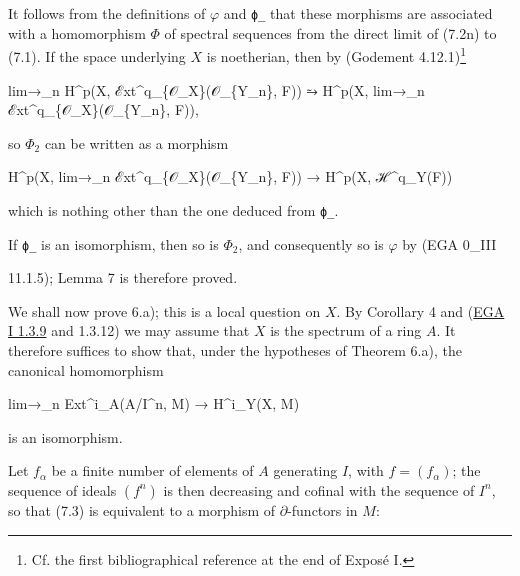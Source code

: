 \documentclass[
  11pt,
  a4paper,
]{book}
\newenvironment{Shaded}{}{}
\newcommand{\NormalTok}[1]{#1}
\begin{document}
It follows from the definitions of \(\varphi\) and \texttt{ϕ̲} that these
morphisms are associated with a homomorphism \(\Phi\) of spectral
sequences from the direct limit of (7.2n) to (7.1). If the space
underlying \(X\) is noetherian, then by (Godement 4.12.1)\footnote{Cf.
  the first bibliographical reference at the end of Exposé I.}

\begin{Shaded}
\begin{Highlighting}[]
\NormalTok{lim→\_n H\^{}p(X, ℰxt\^{}q\_\{𝒪\_X\}(𝒪\_\{Y\_n\}, F)) ⥲ H\^{}p(X, lim→\_n ℰxt\^{}q\_\{𝒪\_X\}(𝒪\_\{Y\_n\}, F)),}
\end{Highlighting}
\end{Shaded}

so \(\Phi_{2}\) can be written as a morphism

\begin{Shaded}
\begin{Highlighting}[]
\NormalTok{H\^{}p(X, lim→\_n ℰxt\^{}q\_\{𝒪\_X\}(𝒪\_\{Y\_n\}, F)) → H\^{}p(X, ℋ\^{}q\_Y(F))}
\end{Highlighting}
\end{Shaded}

which is nothing other than the one deduced from \texttt{ϕ̲}.

If \texttt{ϕ̲} is an isomorphism, then so is \(\Phi_{2}\), and
consequently so is \(\varphi\) by (EGA 0\_III

11.1.5); Lemma 7 is therefore proved.

We shall now prove 6.a); this is a local question on \(X\). By Corollary
4 and
(\href{https://jcreinhold.github.io/ega/i/01-01-affine-schemes.html\#13-sheaf-associated-to-a-module}{EGA
I 1.3.9} and 1.3.12) we may assume that \(X\) is the spectrum of a ring
\(A\). It therefore suffices to show that, under the hypotheses of
Theorem 6.a), the canonical homomorphism

\begin{Shaded}
\begin{Highlighting}[]
\NormalTok{lim→\_n Ext\^{}i\_A(A/I\^{}n, M) → H\^{}i\_Y(X, M)}
\end{Highlighting}
\end{Shaded}

is an isomorphism.

Let \(f_{\alpha}\) be a finite number of elements of \(A\) generating
\(I\), with \(f = (f_{\alpha})\); the sequence of ideals \((f^{n})\) is
then decreasing and cofinal with the sequence of \(I^{n}\), so that
(7.3) is equivalent to a morphism of \(\partial\)-functors in \(M\):
\end{document}
